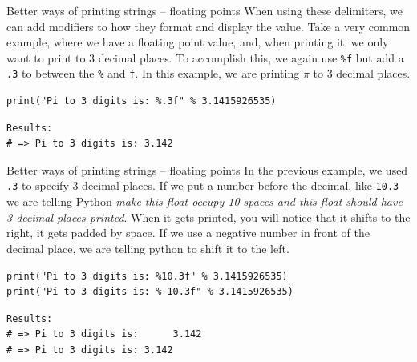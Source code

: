 \documentclass[10pt]{beamer}
\begin{document}
\begin{frame}[label={sec:org50cda86},fragile]{Better ways of printing strings -- floating points}
 When using these delimiters, we can add modifiers to how they format and display the
value. Take a very common example, where we have a floating point value, and, when
printing it, we only want to print to 3 decimal places. To accomplish this, we again
use \texttt{\%f} but add a \texttt{.3} to between the \texttt{\%} and \texttt{f}. In this example, we are printing \(\pi\) to 3
decimal places.

\begin{verbatim}
print("Pi to 3 digits is: %.3f" % 3.1415926535)
\end{verbatim}

\begin{verbatim}
Results: 
# => Pi to 3 digits is: 3.142
\end{verbatim}
\end{frame}

\begin{frame}[label={sec:orgc3c3d5d},fragile]{Better ways of printing strings -- floating points}
 In the previous example, we used \texttt{.3} to specify 3 decimal places. If we put a number
before the decimal, like \texttt{10.3} we are telling Python \emph{make this float occupy 10 spaces
and this float should have 3 decimal places printed}.  When it gets printed, you will
notice that it shifts to the right, it gets padded by space. If we use a negative
number in front of the decimal place, we are telling python to shift it to the left.

\begin{verbatim}
print("Pi to 3 digits is: %10.3f" % 3.1415926535)
print("Pi to 3 digits is: %-10.3f" % 3.1415926535)
\end{verbatim}

\begin{verbatim}
Results: 
# => Pi to 3 digits is:      3.142
# => Pi to 3 digits is: 3.142
\end{verbatim}
\end{frame}
\end{document}
